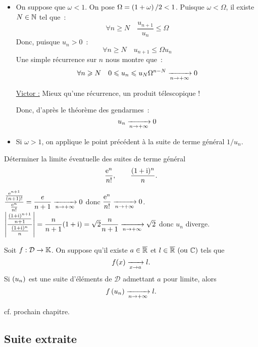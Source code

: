 \documentclass{magnolia}
\begin{document}
\begin{preuve}
$\quad$
\begin{itemize}
\item On suppose que $\omega<1$. On pose $\Omega=\left(1+\omega\right)/2 <1$. Puisque
  $\omega < \Omega$, il existe $N\in\mathbb{N}$ tel que~:
  \[\forall n\geq N \quad \frac{u_{n+1}}{u_n}\leq \Omega\]
  Donc, puisque $u_n>0$~:
  \[\forall n\geq N \quad u_{n+1} \leq \Omega u_n\]
  Une simple récurrence sur $n$ nous montre que~:
  \[\forall n\geqslant N\quad 0\leqslant u_n \leqslant u_N \Omega^{n-N} 
    \xrightarrow[n\rightarrow +\infty]{} 0\]
    
    \underline{Victor :} Mieux qu'une récurrence, un produit télescopique !
    
    
  Donc, d'après le théorème des gendarmes~:
 \[u_n \xrightarrow[n\rightarrow +\infty]{} 0\]
\item Si $\omega>1$, on applique le point précédent à la suite de terme général
  $1/u_n$.
\end{itemize}
\end{preuve}

\begin{exoUnique}
\exo Déterminer la limite éventuelle des suites de terme général
  \[\frac{{\rm e}^n}{n!}, \qquad \frac{(1+{\rm i})^n}{n}.\]
\end{exoUnique}

\begin{sol}
$\dfrac{\frac{{\rm e}^{n+1}}{(n+1)!}}{\frac{{\rm e}^n}{n!}}=\dfrac{e}{n+1}\xrightarrow[n\rightarrow +\infty]{}0$ donc $\dfrac{{\rm e}^n}{n!}\xrightarrow[n\rightarrow +\infty]{}0$.
\\
$\left|\dfrac{\frac{(1+{\rm i})^{n+1}}{n+1}}{\frac{(1+{\rm i})^n}{n}}\right|={\dfrac{n}{n+1}(1+{\rm i})}=\sqrt{2}\dfrac{n}{n+1}\xrightarrow[n\rightarrow +\infty]{}\sqrt{2}$ donc $u_n$ diverge.
\end{sol}




\begin{proposition}[utile=-3]
Soit $f:\mathcal{D}\to\mathbb{K}$. On suppose qu'il existe $a\in\overline{\mathbb{R}}$ et $l\in\text{$\overline{\mathbb{R}}$ (ou $\mathbb{C}$)}$ tels que
\[f(x)\xrightarrow[x\rightarrow a]{}l.\]
Si $\left(u_n\right)$ est une suite d'éléments de $\mathcal{D}$ admettant $a$ pour limite, alors
\[f\left(u_n\right)\xrightarrow[n\rightarrow +\infty]{} l.\]
\end{proposition}

\begin{preuve}
cf. prochain chapitre.
\end{preuve}


\subsection{Suite extraite}
\end{document}
